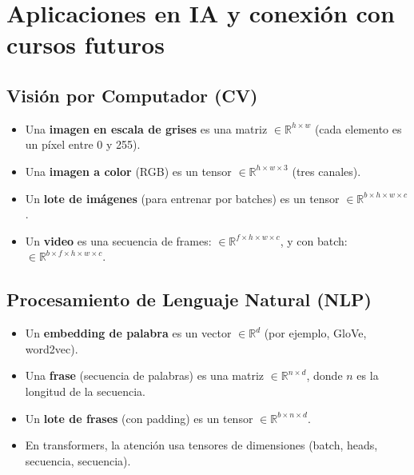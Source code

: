 \documentclass[12pt,a4paper,openany,oneside]{book}
\begin{document}
\begin{center}
\end{center}

\section{Aplicaciones en IA y conexión con cursos futuros}

\subsection{Visión por Computador (CV)}
\begin{itemize}
    \item Una \textbf{imagen en escala de grises} es una matriz $\in \mathbb{R}^{h \times w}$ (cada elemento es un píxel entre 0 y 255).
    \item Una \textbf{imagen a color} (RGB) es un tensor $\in \mathbb{R}^{h \times w \times 3}$ (tres canales).
    \item Un \textbf{lote de imágenes} (para entrenar por batches) es un tensor $\in \mathbb{R}^{b \times h \times w \times c}$.
    \item Un \textbf{video} es una secuencia de frames: $\in \mathbb{R}^{f \times h \times w \times c}$, y con batch: $\in \mathbb{R}^{b \times f \times h \times w \times c}$.
\end{itemize}

\subsection{Procesamiento de Lenguaje Natural (NLP)}
\begin{itemize}
    \item Un \textbf{embedding de palabra} es un vector $\in \mathbb{R}^{d}$ (por ejemplo, GloVe, word2vec).
    \item Una \textbf{frase} (secuencia de palabras) es una matriz $\in \mathbb{R}^{n \times d}$, donde $n$ es la longitud de la secuencia.
    \item Un \textbf{lote de frases} (con padding) es un tensor $\in \mathbb{R}^{b \times n \times d}$.
    \item En transformers, la atención usa tensores de dimensiones (batch, heads, secuencia, secuencia).
\end{itemize}
\end{document}
